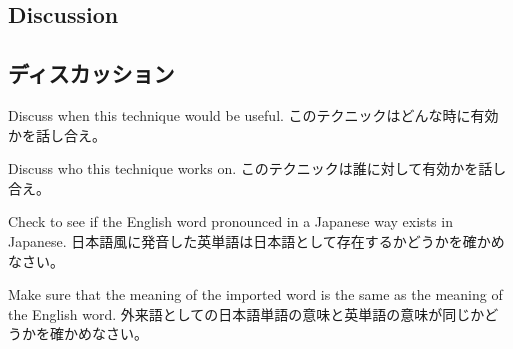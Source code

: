 \documentclass[uplatex,dvipdfmx,b5paper,english,10pt]{jsbook}
\begin{document}
\ifEnglish
\subsection{Discussion}
\else
\subsection{ディスカッション}
\fi

\begin{toiquestion}
\ifEnglish
Discuss when this technique would be useful.
\else
このテクニックはどんな時に有効かを話し合え。
\fi
\end{toiquestion}
\begin{toiquestion}
\ifEnglish
Discuss who this technique works on.
\else
このテクニックは誰に対して有効かを話し合え。
\fi
\end{toiquestion}
\begin{toiquestion}
\ifEnglish
Check to see if the English word pronounced in a Japanese way exists in Japanese.
\else
日本語風に発音した英単語は日本語として存在するかどうかを確かめなさい。
\fi
\end{toiquestion}
\begin{toiquestion}
\ifEnglish
Make sure that the meaning of the imported word is the same as the meaning of the English word.
\else
外来語としての日本語単語の意味と英単語の意味が同じかどうかを確かめなさい。
\fi
\end{toiquestion}



%

%
%
%
\end{document}
